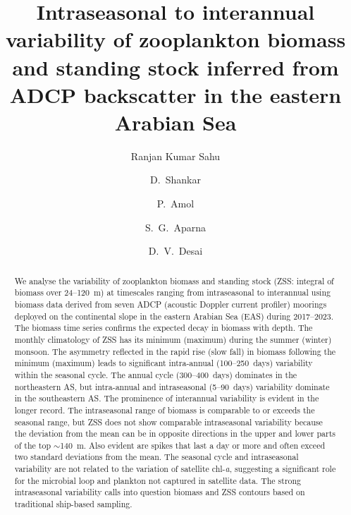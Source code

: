 \documentclass[authoryear,review,11pt]{elsarticle}
\newcommand{\chla}{chl-{\emph{a}}}
\begin{document}
\begin{frontmatter}

\title{Intraseasonal to interannual variability of zooplankton biomass and standing stock inferred from ADCP backscatter in the eastern Arabian Sea}



\author[1,2]{Ranjan Kumar Sahu}

\author[1,2]{D.~Shankar}

\author[2,3]{P.~Amol}
\author[1,2]{S.~G.~Aparna}
\author[1,2]{D.~V.~Desai}


\address[1]{CSIR-National Institute of Oceanography,Dona Paula,403004,Goa,India}

\address[2]{Academy of Scientific and Innovative Research (AcSIR), 
	Ghaziabad,
	201002,
	Uttar~Pradesh,
	India}

\address[3]{CSIR-NIO Regional Centre, Visakhapatnam, 530017, Andhra Pradesh, India}



\begin{abstract}

We analyse the variability of zooplankton biomass and standing stock (ZSS: integral of biomass over 24--120~m) at timescales ranging from intraseasonal to interannual using biomass data derived from seven ADCP (acoustic Doppler current profiler) moorings deployed on the continental slope in the eastern Arabian Sea (EAS) during 2017--2023. The biomass time series confirms the expected decay in biomass with depth. The monthly climatology of ZSS has its minimum (maximum) during the summer (winter) monsoon. The asymmetry reflected in the rapid rise (slow fall) in biomass following the minimum (maximum) leads to significant intra-annual (100--250~days) variability within the seasonal cycle. The annual cycle (300--400~days) dominates in the northeastern AS, but intra-annual and intraseasonal (5--90~days) variability dominate in the southeastern AS. The prominence of interannual variability is evident in the longer record. The intraseasonal range of biomass is comparable to or exceeds the seasonal range, but ZSS does not show comparable intraseasonal variability because the deviation from the mean can be in opposite directions in the upper and lower parts of the top $\sim$140~m. Also evident are spikes that last a day or more and often exceed two standard deviations from the mean. The seasonal cycle and intraseasonal variability are not related to the variation of satellite \chla, suggesting a significant role for the microbial loop and plankton not captured in satellite data. The strong intraseasonal variability calls into question biomass and ZSS contours based on traditional ship-based sampling.


\end{abstract}
\end{frontmatter}
\end{document}
